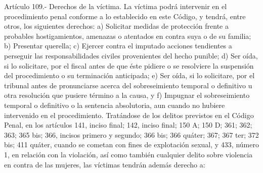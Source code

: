     Artículo 109.- Derechos de la víctima. La víctima podrá intervenir en el procedimiento penal conforme a lo establecido en este Código, y tendrá, entre otros, los siguientes derechos:
    a) Solicitar medidas de protección frente a probables hostigamientos, amenazas o atentados en contra suya o de su familia;
    b) Presentar querella;
    c) Ejercer contra el imputado acciones tendientes a perseguir las responsabilidades civiles provenientes del hecho punible;
    d) Ser oída, si lo solicitare, por el fiscal antes de que éste pidiere o se resolviere la suspensión del procedimiento o su terminación anticipada;
    e) Ser oída, si lo solicitare, por el tribunal antes de pronunciarse acerca del sobreseimiento temporal o definitivo u otra resolución que pusiere término a la causa, y
    f) Impugnar el sobreseimiento temporal o definitivo o la sentencia absolutoria, aun cuando no hubiere intervenido en el procedimiento.
    Tratándose de los delitos previstos en el Código Penal, en los artículos 141, inciso final; 142, inciso final; 150 A; 150 D; 361; 362; 363; 365 bis; 366, incisos primero y segundo; 366 bis; 366 quáter; 367; 367 ter; 372 bis; 411 quáter, cuando se cometan con fines de explotación sexual, y 433, número 1, en relación con la violación, así como también cualquier delito sobre violencia en contra de las mujeres, las víctimas tendrán además derecho a:
     
